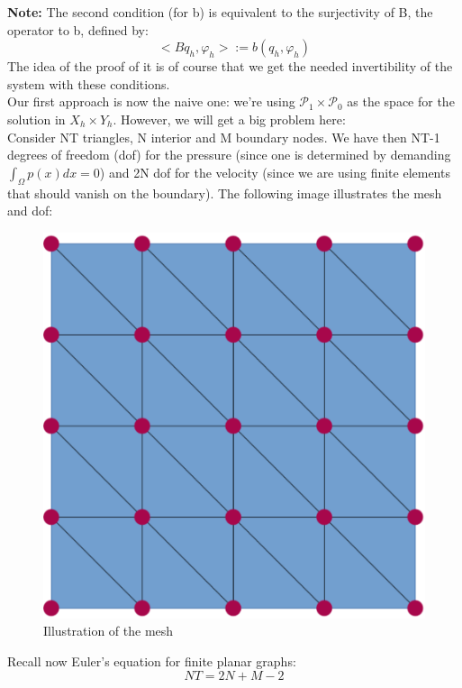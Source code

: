 \documentclass[12pt,a4paper]{report}
\begin{document}
\textbf{Note:} The second condition (for b) is equivalent to the surjectivity of B, the operator to b, defined by:
\begin{equation}
    <Bq_h,\varphi_h> := b(q_h,\varphi_h)
\end{equation}
The idea of the proof of it is of course that we get the needed invertibility of the system with these conditions.\\

Our first approach is now the naive one: we're using \(\mathcal{P}_1 \times \mathcal{P}_0\) as the space for the solution in \(X_h \times Y_h\). However, we will get a big problem here\cite{brezzi}:\\
Consider NT triangles, N interior and M boundary nodes. We have then NT-1 degrees of freedom (dof) for the pressure (since one is determined by demanding \(\int_{\Omega} p(x) dx = 0\)) and 2N dof for the velocity (since we are using finite elements that should vanish on the boundary). The following image illustrates the mesh and dof:
\begin{figure}[H]
\centering
\includegraphics[scale=0.5]{TriangleMeshStokes.pdf}
\caption{\label{fig:mesh}Illustration of the mesh}
\end{figure}
Recall now Euler's equation for finite planar graphs:
\begin{equation}
    NT = 2N + M - 2
\end{equation}
\end{document}
